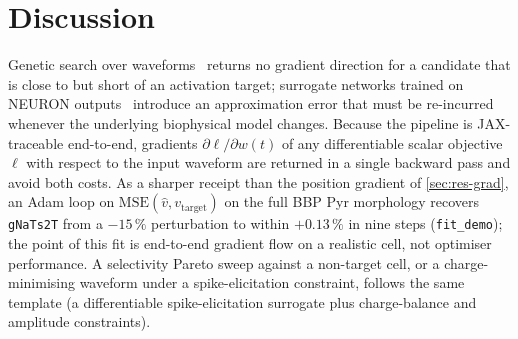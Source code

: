 \section{Discussion}\label{sec:discussion}

Genetic search over
waveforms~\cite{grill2015model,wongsarnpigoon2010energy} returns no
gradient direction for a candidate that is close to but short of an
activation target; surrogate networks trained on NEURON
outputs~\cite{hussain2024efficient} introduce an approximation error
that must be re-incurred whenever the underlying biophysical model
changes. Because the pipeline is JAX-traceable end-to-end, gradients
$\partial \ell / \partial w(t)$ of any differentiable scalar objective
$\ell$ with respect to the input waveform are returned in a single
backward pass and avoid both costs. As a
sharper receipt than the position gradient of \cref{sec:res-grad}, an
Adam loop on $\mathrm{MSE}(\hat{v}, v_\mathrm{target})$ on the full
BBP Pyr morphology recovers \texttt{gNaTs2T} from a $-15\,\%$
perturbation to within $+0.13\,\%$ in nine steps
(\texttt{fit\_demo}); the point of this fit is end-to-end gradient
flow on a realistic cell, not optimiser performance. A selectivity
Pareto sweep against a non-target cell, or a charge-minimising waveform
under a spike-elicitation constraint, follows the same template (a
differentiable spike-elicitation surrogate plus charge-balance and
amplitude constraints).
